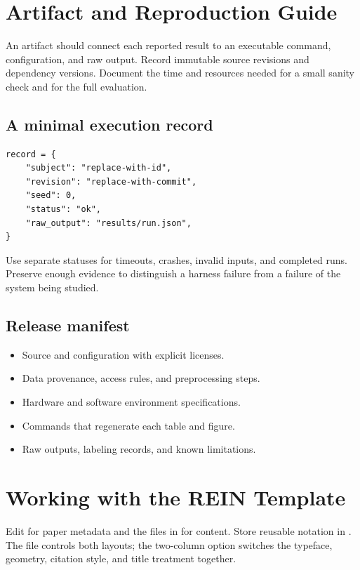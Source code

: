 \section{Artifact and Reproduction Guide}
\label{app:artifact}
An artifact should connect each reported result to an executable command,
configuration, and raw output. Record immutable source revisions and
dependency versions. Document the time and resources needed for a small
sanity check and for the full evaluation.

\subsection{A minimal execution record}
\begin{lstlisting}[language=REINPython,caption={Illustrative record format;
replace fields with the study's actual schema.},label={lst:record}]
record = {
    "subject": "replace-with-id",
    "revision": "replace-with-commit",
    "seed": 0,
    "status": "ok",
    "raw_output": "results/run.json",
}
\end{lstlisting}

Use separate statuses for timeouts, crashes, invalid inputs, and completed
runs. Preserve enough evidence to distinguish a harness failure from a
failure of the system being studied.

\subsection{Release manifest}
\begin{itemize}
  \item Source and configuration with explicit licenses.
  \item Data provenance, access rules, and preprocessing steps.
  \item Hardware and software environment specifications.
  \item Commands that regenerate each table and figure.
  \item Raw outputs, labeling records, and known limitations.
\end{itemize}

\newpage
\section{Working with the REIN Template}
Edit  for paper metadata and the files in
 for content. Store reusable notation in
. The  file controls both layouts;
the two-column option switches the typeface, geometry, citation style,
and title treatment together.

